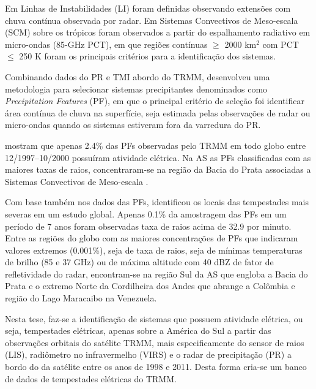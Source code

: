 Em  Linhas de Instabilidades (LI) foram definidas observando extensões com chuva contínua observada por radar. Em  Sistemas Convectivos de Meso-escala (SCM) sobre os trópicos foram observados a partir do espalhamento radiativo em micro-ondas (85-GHz PCT), em que regiões contínuas $\geqslant$ 2000 km$^2$ com PCT $\leqslant$ 250 K foram os principais critérios para a identificação dos sistemas.


Combinando dados do PR e TMI abordo do TRMM,  desenvolveu uma metodologia para selecionar sistemas precipitantes denominados como \textit{Precipitation Features} (PF), em que o principal critério de seleção foi identificar área contínua de chuva na superfície, seja estimada pelas observações de radar ou micro-ondas quando os sistemas estiveram fora da varredura do PR.



 mostram que apenas 2.4\% das PFs observadas pelo TRMM em todo globo entre 12/1997--10/2000 possuíram atividade elétrica. Na AS as PFs classificadas com as maiores taxas de raios, concentraram-se na região da Bacia do Prata associadas a Sistemas Convectivos de Meso-escala \cite{Velasco1987,Durkee2009}.   


Com base também nos dados das PFs,   identificou os locais das tempestades mais severas em um estudo global. Apenas 0.1\% da amostragem das PFs em um período de 7 anos foram observadas taxa de raios acima de 32.9 por minuto.  Entre as regiões do globo com as maiores concentrações de PFs que indicaram valores extremos (0.001\%), seja de taxa de raios, seja de mínimas temperaturas de brilho (85 e 37 GHz) ou de máxima altitude com 40 dBZ de fator de refletividade do radar, encontram-se na região Sul da AS que engloba a Bacia do Prata e o extremo Norte da Cordilheira dos Andes que abrange a Colômbia e região do Lago Maracaibo na Venezuela. 

Nesta tese, faz-se a identificação de sistemas que possuem atividade elétrica, ou seja, tempestades elétricas, apenas sobre a América do Sul  a partir das observações orbitais do satélite TRMM, mais especificamente do sensor de raios (LIS), radiômetro no infravermelho (VIRS) e o radar de precipitação (PR) a bordo do da satélite entre os anos de 1998 e 2011. Desta forma cria-se um banco de dados de tempestades elétricas do TRMM.


